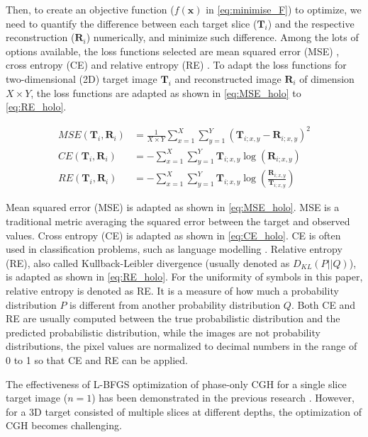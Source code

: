 Then, to create an objective function ($f(\textbf{x})$ in \cref{eq:minimise_F}) to optimize, we need to quantify the difference between each target slice ($\textbf{T}_i$) and the respective reconstruction ($\textbf{R}_i$) numerically, and minimize such difference. Among the lots of options available, the loss functions selected are mean squared error (MSE) \cite{MSE_REF}, cross entropy (CE) \cite{cybenko1998mathematics} and relative entropy (RE) \cite{Kullback1951}. To adapt the loss functions for two-dimensional (2D) target image $\textbf{T}_i$ and reconstructed image $\textbf{R}_i$ of dimension $X\times Y$, the loss functions are adapted as shown in \cref{eq:MSE_holo} to \cref{eq:RE_holo}.

\begin{align}
	MSE(\textbf{T}_i, \textbf{R}_i) & = \frac{1}{X\times Y} \sum_{x=1}^{X} \sum_{y=1}^{Y} (\textbf{T}_{i;x,y}-\textbf{R}_{i;x,y})^2\label{eq:MSE_holo}                     \\
	CE(\textbf{T}_i, \textbf{R}_i)  & = -\sum_{x=1}^{X} \sum_{y=1}^{Y} \textbf{T}_{i;x,y}\log(\textbf{R}_{i;x,y})\label{eq:CE_holo}                                        \\
	RE(\textbf{T}_i, \textbf{R}_i)  & = -\sum_{x=1}^{X} \sum_{y=1}^{Y} \textbf{T}_{i;x,y}\log\left(\frac{\textbf{R}_{i;x,y}}{\textbf{T}_{i;x,y}}\right) \label{eq:RE_holo}
\end{align}

Mean squared error (MSE) is adapted as shown in \cref{eq:MSE_holo}. MSE is a traditional metric averaging the squared error between the target and observed values. Cross entropy (CE) is adapted as shown in \cref{eq:CE_holo}. CE is often used in classification problems, such as language modelling \cite{Liu2018}. Relative entropy (RE), also called Kullback-Leibler divergence (usually denoted as $D_{KL}(P\vert\vert Q)$), is adapted as shown in \cref{eq:RE_holo}. For the uniformity of symbols in this paper, relative entropy is denoted as RE. It is a measure of how much a probability distribution $P$ is different from another probability distribution $Q$. Both CE and RE are usually computed between the true probabilistic distribution and the predicted probabilistic distribution, while the images are not probability distributions, the pixel values are normalized to decimal numbers in the range of 0 to 1 so that CE and RE can be applied.

The effectiveness of L-BFGS optimization of phase-only CGH for a single slice target image ($n=1$) has been demonstrated in the previous research \cite{Sha2022}. However, for a 3D target consisted of multiple slices at different depths, the optimization of CGH becomes challenging.

